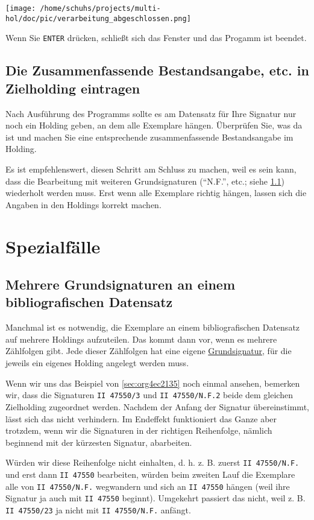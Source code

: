 \documentclass[10pt, a4paper]{scrartcl}
\begin{document}
\begin{center}
\texttt{[image: /home/schuhs/projects/multi-hol/doc/pic/verarbeitung\_abgeschlossen.png]}
\end{center}

Wenn Sie \texttt{ENTER} drücken, schließt sich das Fenster und das Progamm ist beendet.
\subsection{Die Zusammenfassende Bestandsangabe, etc. in Zielholding eintragen}
\label{sec:org1ee5f09}
Nach Ausführung des Programms sollte es am Datensatz für Ihre Signatur nur
noch ein Holding geben, an dem alle Exemplare hängen. Überprüfen Sie, was
da ist und machen Sie eine entsprechende zusammenfassende Bestandsangabe
im Holding.

Es ist empfehlenswert, diesen Schritt am Schluss zu machen, weil es sein
kann, dass die Bearbeitung mit weiteren Grundsignaturen ("`N.F."', etc.;
siehe \ref{sec:org963176c})
wiederholt werden muss. Erst wenn alle Exemplare richtig hängen, lassen
sich die Angaben in den Holdings korrekt machen.
\section{Spezialfälle}
\label{sec:orgb9ae822}
\subsection{Mehrere Grundsignaturen an einem bibliografischen Datensatz}
\label{sec:org963176c}
Manchmal ist es notwendig, die Exemplare an einem bibliografischen
Datensatz auf mehrere Holdings aufzuteilen. Das kommt dann vor, wenn es
mehrere Zählfolgen gibt. Jede dieser Zählfolgen hat eine eigene \hyperref[sec:org9cf4c48]{Grundsignatur}, 
für die jeweils ein eigenes Holding angelegt werden muss.

Wenn wir uns das Beispiel von \ref{sec:org4ec2135} noch einmal ansehen,
bemerken wir, dass die Signaturen \texttt{II 47550/3} und \texttt{II 47550/N.F.2} beide
dem gleichen Zielholding zugeordnet werden. Nachdem der Anfang der
Signatur übereinstimmt, lässt sich das nicht verhindern. Im Endeffekt
funktioniert das Ganze aber trotzdem, wenn wir die Signaturen in der richtigen
Reihenfolge, nämlich beginnend mit der kürzesten Signatur, abarbeiten.

Würden wir diese Reihenfolge nicht einhalten, d. h. z. B. zuerst \texttt{II
      47550/N.F.} und erst dann \texttt{II 47550} bearbeiten, würden beim zweiten Lauf
die Exemplare alle von \texttt{II 47550/N.F.} wegwandern und sich an \texttt{II 47550}
hängen (weil ihre Signatur ja auch mit \texttt{II 47550} beginnt). Umgekehrt
passiert das nicht, weil z. B. \texttt{II 47550/23} ja nicht mit \texttt{II 47550/N.F.}
anfängt.
\end{document}
